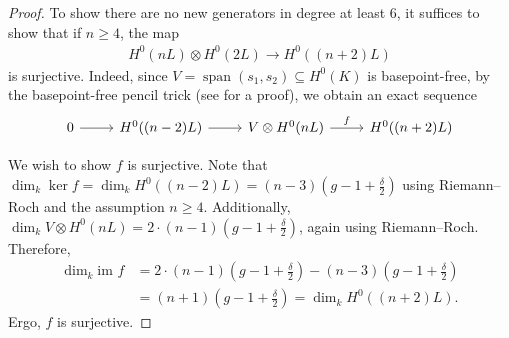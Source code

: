 \documentclass{amsart}
\theoremstyle{plain}
\theoremstyle{definition}
\theoremstyle{remark}
\newtheorem{rem}[thm]{Remark}
\numberwithin{equation}{section}
\newcommand\im{\text{im }}
\DeclareMathOperator{\newspan}{span}
\begin{document}

\begin{proof}
To show there are no new generators in degree at least $6$, it
suffices to show that if $n \geq 4$, the map
\begin{align*}
	H^0(nL) \otimes H^0(2L) \rightarrow H^0((n+2)L)
\end{align*}
is surjective. Indeed, since $V = \newspan(s_1, s_2) \subseteq
H^0(K)$ is basepoint-free, by the basepoint-free pencil trick (see
\cite[Lemma 2.6]{saint-donat:proj} for a proof), we obtain an exact
sequence
$$\begin{tikzcd}
0 \ar r & H^0((n-2)L) \ar r & V \otimes H^0(nL) \ar{r}{f} & H^0((n+2)L)
\end{tikzcd}$$

We wish to show $f$ is surjective.
Note that $\dim_k \ker f = \dim_k H^0((n - 2)L) = (n - 3)(g - 1+\frac{\delta}{2})$ using Riemann--Roch and the assumption $n \geq 4.$
Additionally, $\dim_k V \otimes H^0(nL) = 2 \cdot (n - 1)(g - 1+\frac{\delta}{2})$, again using Riemann--Roch.
Therefore,
\begin{align*}
	\dim_k \im f 	& = 2 \cdot (n - 1)(g - 1+ \frac{\delta}{2}) - (n - 3)(g - 1 + \frac{\delta}{2})\\
				& = (n + 1)(g - 1 + \frac{\delta}{2}) = \dim_k H^0((n + 2)L).
\end{align*}
Ergo, $f$ is surjective.
\end{proof}
\end{document}

